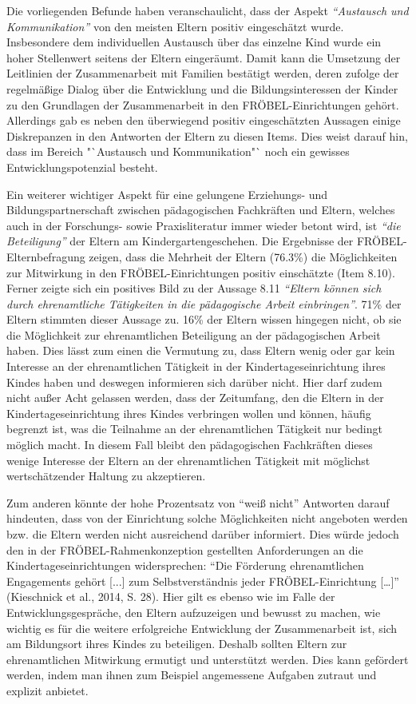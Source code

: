 \documentclass[12pt,a4paper]{article}
\begin{document}
	Die vorliegenden Befunde haben veranschaulicht, dass der Aspekt \textit{"`Austausch und Kommunikation"'} von den meisten Eltern positiv eingeschätzt wurde. Insbesondere dem individuellen Austausch über das einzelne Kind wurde ein hoher Stellenwert seitens der Eltern eingeräumt. Damit kann die Umsetzung der Leitlinien der Zusammenarbeit mit Familien bestätigt werden, deren zufolge der regelmäßige Dialog über die Entwicklung und die Bildungsinteressen der Kinder zu den Grundlagen der Zusammenarbeit in den FRÖBEL-Einrichtungen gehört. Allerdings gab es neben den überwiegend positiv eingeschätzten Aussagen einige Diskrepanzen in den Antworten der Eltern zu diesen Items. Dies weist darauf hin, dass im Bereich "`Austausch und Kommunikation"` noch ein gewisses Entwicklungspotenzial besteht.
	
	Ein weiterer wichtiger Aspekt für eine gelungene Erziehungs- und Bildungspartnerschaft zwischen pädagogischen Fachkräften und Eltern, welches auch in der Forschungs- sowie Praxisliteratur immer wieder betont wird, ist \textit{"`die Beteiligung"'} der Eltern am Kindergartengeschehen. Die Ergebnisse der FRÖBEL-Elternbefragung zeigen, dass die Mehrheit der Eltern (76.3\%) die Möglichkeiten zur Mitwirkung in den FRÖBEL-Einrichtungen positiv einschätzte (Item 8.10). Ferner zeigte sich ein positives Bild zu der Aussage 8.11 \textit{"`Eltern können sich durch ehrenamtliche Tätigkeiten in die pädagogische Arbeit einbringen"'}. 71\% der Eltern stimmten dieser Aussage zu. 16\% der Eltern wissen hingegen nicht, ob sie die Möglichkeit zur ehrenamtlichen Beteiligung an der pädagogischen Arbeit haben. Dies lässt zum einen die Vermutung zu, dass Eltern wenig oder gar kein Interesse an der ehrenamtlichen Tätigkeit in der Kindertageseinrichtung ihres Kindes haben und deswegen informieren sich darüber nicht. Hier darf zudem nicht außer Acht gelassen werden, dass der Zeitumfang, den die Eltern in der Kindertageseinrichtung ihres Kindes verbringen wollen und können, häufig begrenzt ist, was die Teilnahme an der ehrenamtlichen Tätigkeit nur bedingt möglich macht. In diesem Fall bleibt den pädagogischen Fachkräften dieses wenige Interesse der Eltern an der ehrenamtlichen Tätigkeit mit möglichst wertschätzender Haltung zu akzeptieren.
	
Zum anderen könnte der hohe Prozentsatz von "`weiß nicht"' Antworten darauf hindeuten, dass von der Einrichtung solche Möglichkeiten nicht angeboten werden bzw. die Eltern werden nicht ausreichend darüber informiert. Dies würde jedoch den in der FRÖBEL-Rahmenkonzeption gestellten Anforderungen an die Kindertageseinrichtungen widersprechen: "`Die Förderung ehrenamtlichen Engagements gehört [...] zum Selbstverständnis jeder FRÖBEL-Einrichtung […]"' (Kieschnick et al., 2014, S. 28). Hier gilt es ebenso wie im Falle der Entwicklungsgespräche, den Eltern aufzuzeigen und bewusst zu machen, wie wichtig es für die weitere erfolgreiche Entwicklung der Zusammenarbeit ist, sich am Bildungsort ihres Kindes zu beteiligen. Deshalb sollten Eltern zur ehrenamtlichen Mitwirkung ermutigt und unterstützt werden. Dies kann gefördert werden, indem man ihnen zum Beispiel angemessene Aufgaben zutraut und explizit anbietet. 
\end{document}
